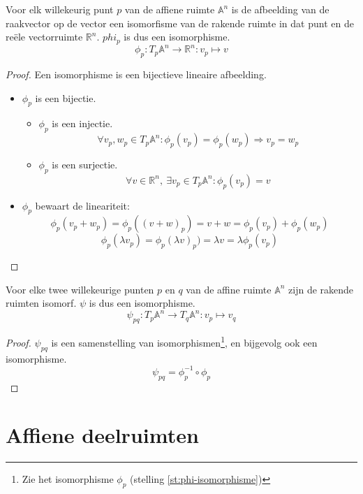 \documentclass[main.tex]{subfiles}
\begin{document}
\begin{st}
  \label{st:phi-isomorphisme}
  Voor elk willekeurig punt $p$ van de affiene ruimte $\mathbb{A}^{n}$ is de afbeelding van de raakvector op de vector een isomorfisme van de rakende ruimte in dat punt en de re\"ele vectorruimte $\mathbb{R}^{n}$.
  $phi_{p}$ is dus een isomorphisme.
  \[ \phi_{p}: T_{p}\mathbb{A}^{n} \rightarrow \mathbb{R}^{n}: v_{p} \mapsto v \]

  \begin{proof}
    Een isomorphisme is een bijectieve lineaire afbeelding.
    \begin{itemize}
    \item $\phi_{p}$ is een bijectie.
      \begin{itemize}
      \item $\phi_{p}$ is een injectie.
      \[ \forall v_{p},w_{p} \in T_{p}\mathbb{A}^{n}: \phi_{p}(v_{p}) = \phi_{p}(w_{p}) \Rightarrow v_{p} = w_{p}\]
      \item $\phi_{p}$ is een surjectie.
      \[ \forall v \in \mathbb{R}^{n},\ \exists v_{p} \in T_{p}\mathbb{A}^{n}: \phi_{p}(v_{p}) = v \]
      \end{itemize}
    \item $\phi_{p}$ bewaart de lineariteit:
    \[ \phi_{p}(v_{p}+w_{p}) = \phi_{p}((v+w)_{p}) = v + w = \phi_{p}(v_{p}) + \phi_{p}(w_{p}) \] 
    \[ \phi_{p}(\lambda v_{p}) = \phi_{p}(\lambda v)_{p}) = \lambda v = \lambda\phi_{p}(v_{p})\]
    \end{itemize}
  \end{proof}
\end{st}

\begin{st}
  Voor elke twee willekeurige punten $p$ en $q$ van de affine ruimte $\mathbb{A}^{n}$ zijn de rakende ruimten isomorf.
  $\psi$ is dus een isomorphisme.
  \[ \psi_{pq}: T_{p}\mathbb{A}^{n} \rightarrow T_{q}\mathbb{A}^{n}: v_{p} \mapsto v_{q}\]

  \begin{proof}
    $\psi_{pq}$ is een samenstelling van isomorphismen\footnote{Zie het isomorphisme $\phi_{p}$ (stelling \ref{st:phi-isomorphisme})}, en bijgevolg ook een isomorphisme.
    \[ \psi_{pq} = \phi_{p}^{-1} \circ\phi_{p}\]
  \end{proof}
\end{st}

\section{Affiene deelruimten}
\label{sec:affiene-deelruimten}
\end{document}
